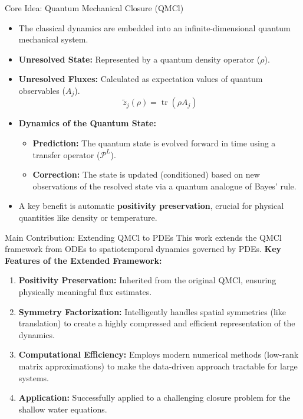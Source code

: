 \documentclass{beamer}
\DeclareMathOperator{\tr}{tr}
\begin{document}
\begin{frame}{Core Idea: Quantum Mechanical Closure (QMCl)}
    \begin{itemize}
        \item The classical dynamics are embedded into an infinite-dimensional quantum mechanical system.
        \item \textbf{Unresolved State:} Represented by a quantum density operator ($\rho$).
        \item \textbf{Unresolved Fluxes:} Calculated as expectation values of quantum observables ($A_j$).
        \[ \tilde{z}_j(\rho) = \tr(\rho A_j) \]
        \item \textbf{Dynamics of the Quantum State:}
        \begin{itemize}
            \item \textbf{Prediction:} The quantum state is evolved forward in time using a transfer operator ($\mathcal{P}^L$).
            \item \textbf{Correction:} The state is updated (conditioned) based on new observations of the resolved state via a quantum analogue of Bayes' rule.
        \end{itemize}
        \item A key benefit is automatic \textbf{positivity preservation}, crucial for physical quantities like density or temperature.
    \end{itemize}
\end{frame}

\begin{frame}{Main Contribution: Extending QMCl to PDEs}
    This work extends the QMCl framework from ODEs to spatiotemporal dynamics governed by PDEs.
    \vspace{0.5cm}
    \textbf{Key Features of the Extended Framework:}
    \begin{enumerate}
        \item \textbf{Positivity Preservation:} Inherited from the original QMCl, ensuring physically meaningful flux estimates.
        \vspace{0.2cm}
        \item \textbf{Symmetry Factorization:} Intelligently handles spatial symmetries (like translation) to create a highly compressed and efficient representation of the dynamics.
        \vspace{0.2cm}
        \item \textbf{Computational Efficiency:} Employs modern numerical methods (low-rank matrix approximations) to make the data-driven approach tractable for large systems.
        \vspace{0.2cm}
        \item \textbf{Application:} Successfully applied to a challenging closure problem for the shallow water equations.
    \end{enumerate}
\end{frame}
\end{document}

